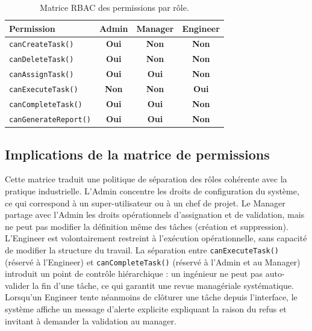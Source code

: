 \documentclass[11pt]{article}
\begin{document}
\begin{table}[H]
\centering
\small
\begin{tabular}{lccc}
\toprule
\textbf{Permission}            & \textbf{Admin} & \textbf{Manager} & \textbf{Engineer} \\
\midrule
\texttt{canCreateTask()}       & \textcolor{accentgreen}{\textbf{Oui}} & \textcolor{accentred}{\textbf{Non}} & \textcolor{accentred}{\textbf{Non}} \\
\texttt{canDeleteTask()}       & \textcolor{accentgreen}{\textbf{Oui}} & \textcolor{accentred}{\textbf{Non}} & \textcolor{accentred}{\textbf{Non}} \\
\texttt{canAssignTask()}       & \textcolor{accentgreen}{\textbf{Oui}} & \textcolor{accentgreen}{\textbf{Oui}} & \textcolor{accentred}{\textbf{Non}} \\
\texttt{canExecuteTask()}      & \textcolor{accentred}{\textbf{Non}}   & \textcolor{accentred}{\textbf{Non}} & \textcolor{accentgreen}{\textbf{Oui}} \\
\texttt{canCompleteTask()}     & \textcolor{accentgreen}{\textbf{Oui}} & \textcolor{accentgreen}{\textbf{Oui}} & \textcolor{accentred}{\textbf{Non}} \\
\texttt{canGenerateReport()}   & \textcolor{accentgreen}{\textbf{Oui}} & \textcolor{accentgreen}{\textbf{Oui}} & \textcolor{accentred}{\textbf{Non}} \\
\bottomrule
\end{tabular}
\caption{Matrice RBAC des permissions par rôle.}
\end{table}

\subsection{Implications de la matrice de permissions}
Cette matrice traduit une politique de séparation des rôles cohérente
avec la pratique industrielle. L'Admin concentre les droits de
configuration du système, ce qui correspond à un super-utilisateur ou à
un chef de projet. Le Manager partage avec l'Admin les droits
opérationnels d'assignation et de validation, mais ne peut pas modifier
la définition même des tâches (création et suppression). L'Engineer est
volontairement restreint à l'exécution opérationnelle, sans capacité de
modifier la structure du travail. La séparation entre
\texttt{canExecuteTask()} (réservé à l'Engineer) et
\texttt{canCompleteTask()} (réservé à l'Admin et au Manager) introduit
un point de contrôle hiérarchique : un ingénieur ne peut pas
auto-valider la fin d'une tâche, ce qui garantit une revue managériale
systématique. Lorsqu'un Engineer tente néanmoins de clôturer une tâche
depuis l'interface, le système affiche un message d'alerte explicite
expliquant la raison du refus et invitant à demander la validation au
manager.
\end{document}
